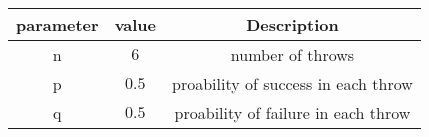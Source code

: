 
\begin{center}
\begin{tabular}{|c|c|c|}
\hline
\textbf{parameter}& \textbf{value} & \textbf{Description} \\ \hline
n	   	& $6$    & number of throws\\ \hline

p		& $0.5$  & proability of success in each throw\\ \hline

q	   	& $0.5$  & proability of failure in each throw\\ \hline
\end{tabular}
\end{center}